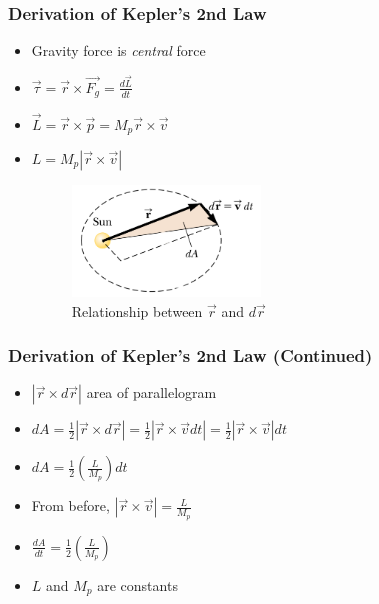 \documentclass{beamer}
\begin{document}
\begin{frame}
\frametitle{Derivation of Kepler's 2nd Law}

\begin{itemize}

\item Gravity force is \textit{central} force

\item $
\vec{\tau} = \vec{r}\times\vec{F_g} = \frac{d\vec{L}}{dt}
$

\item $
 \vec{L} = \vec{r}\times \vec{p} = M_p \vec{r}\times\vec{v} 
 $

\item $
L = M_p \left|\vec{r} \times \vec{v}\right|
$

\begin{figure}[h] 
	\centering
		\includegraphics[width=5cm]{sun2.png}
	\caption{Relationship between  $\vec{r}$ and $d\vec{r}$}
	\label{fig:sun2}
\end{figure}





\end{itemize}


\end{frame}


\begin{frame}
\frametitle{Derivation of Kepler's 2nd Law (Continued)}

\begin{itemize}

\item $|\vec{r} \times d\vec{r}|$  area of parallelogram


\item $ dA = \frac{1}{2}|\vec{r} \times d\vec{r}| = \frac{1}{2}\left|\vec{r} \times \vec{v} dt \right| = \frac{1}{2}\left|\vec{r} \times \vec{v}\right| dt  $

\item $ dA = \frac{1}{2}\left(\frac{L}{M_p}\right)dt  $

\item From before, $\left|\vec{r} \times \vec{v}\right| = \frac{L}{M_p} $

\vspace{1cm}
\item $
\frac{dA}{dt} = \frac{1}{2}\left(\frac{L}{M_p}\right)
$

\item $L$ and $M_p$ are constants

\end{itemize}


\end{frame}
\end{document}
